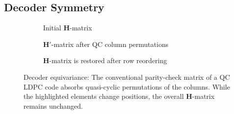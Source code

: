 \documentclass[conference]{IEEEtran}
\newcommand\new[1]{#1}
\begin{document}
\begin{NoHyper}
\subsection{Decoder Symmetry}
\begin{figure*}[t]
   \begin{subfigure}[b]{0.32\linewidth}
	\resizebox{1\columnwidth}{!}{
	
	} 
	\caption{\footnotesize Initial $\mathbf{H}$-matrix} 
	\label{fig:initH}
            \end{subfigure}
       \hfill     \begin{subfigure}[b]{0.32\linewidth}
	\resizebox{1\columnwidth}{!}{
	
	} 
	\caption{\footnotesize \new{$\mathbf{H}'$}-matrix after QC column permutations}
	\label{fig:H_dash}
    \end{subfigure}       
    \hfill
    \begin{subfigure}[b]{0.32\linewidth}
		\resizebox{1\columnwidth}{!}{
		
		} 
		\caption{\footnotesize $\mathbf{H}$-matrix is restored after row reordering}
		\label{fig:H_double_dash}
    \end{subfigure}	          
  
\caption{\footnotesize Decoder equivariance: The conventional parity-check matrix of a \ac{QC} \ac{LDPC} code absorbs quasi-cyclic permutations of the columns. While the highlighted elements change positions, the overall $\mathbf{H}$-matrix remains unchanged.} \label{fig:AEDLDPC}
 \vspace{-0.25cm}
 \end{figure*}


\end{NoHyper}
\end{document}
